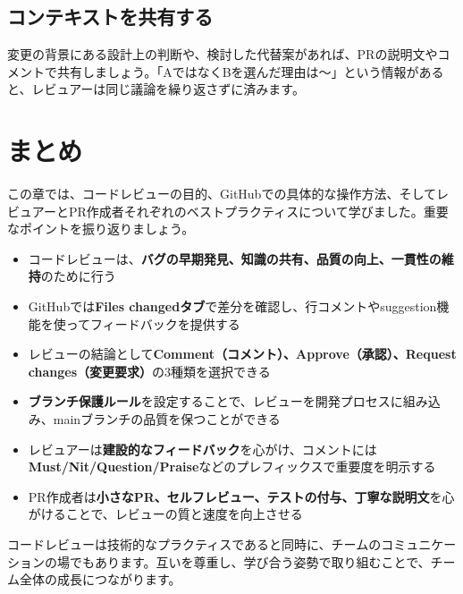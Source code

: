 \subsection{コンテキストを共有する}

変更の背景にある設計上の判断や、検討した代替案があれば、PRの説明文やコメントで共有しましょう。「AではなくBを選んだ理由は〜」という情報があると、レビュアーは同じ議論を繰り返さずに済みます。

\section{まとめ}

この章では、コードレビューの目的、GitHubでの具体的な操作方法、そしてレビュアーとPR作成者それぞれのベストプラクティスについて学びました。重要なポイントを振り返りましょう。

\begin{itemize}
  \item コードレビューは、\textbf{バグの早期発見、知識の共有、品質の向上、一貫性の維持}のために行う
  \item GitHubでは\textbf{Files changedタブ}で差分を確認し、行コメントやsuggestion機能を使ってフィードバックを提供する
  \item レビューの結論として\textbf{Comment（コメント）、Approve（承認）、Request changes（変更要求）}の3種類を選択できる
  \item \textbf{ブランチ保護ルール}を設定することで、レビューを開発プロセスに組み込み、mainブランチの品質を保つことができる
  \item レビュアーは\textbf{建設的なフィードバック}を心がけ、コメントには\textbf{Must/Nit/Question/Praise}などのプレフィックスで重要度を明示する
  \item PR作成者は\textbf{小さなPR、セルフレビュー、テストの付与、丁寧な説明文}を心がけることで、レビューの質と速度を向上させる
\end{itemize}

コードレビューは技術的なプラクティスであると同時に、チームのコミュニケーションの場でもあります。互いを尊重し、学び合う姿勢で取り組むことで、チーム全体の成長につながります。
